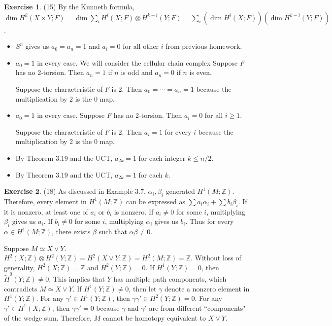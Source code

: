 \documentclass[12pt, psamsfonts]{amsart}
\theoremstyle{definition}
\newtheorem*{exer}{Exercise}
\theoremstyle{remark}
\numberwithin{equation}{section}
\begin{document}
\begin{exer}{(15)}
  By the Kunneth formula, $\dim H^k(X \times Y; F) = \dim \sum_i H^i(X; F) \otimes H^{k - i}(Y; F) = \sum_i (\dim H^i(X; F))(\dim H^{k - i}(Y; F))$.
  \begin{itemize}
    \item
      $S^n$ gives us $a_0 = a_n = 1$ and $a_i = 0$ for all other $i$ from previous homework.
    \item
      $a_0 = 1$ in every case.
      We will consider the cellular chain complex
      Suppose $F$ has no 2-torsion.
      Then $a_n = 1$ if $n$ is odd and $a_n = 0$ if $n$ is even.

      Suppose the characteristic of $F$ is 2.
      Then $a_0 = \cdots = a_n = 1$ because the multiplication by 2 is the 0 map.
    \item
      $a_0 = 1$ in every case.
      Suppose $F$ has no 2-torsion.
      Then $a_i = 0$ for all $i \geq 1$.

      Suppose the characteristic of $F$ is 2.
      Then $a_i = 1$ for every $i$ because the multiplication by 2 is the 0 map.
    \item
      By Theorem 3.19 and the UCT, $a_{2k} = 1$ for each integer $k \leq n / 2$.
    \item
      By Theorem 3.19 and the UCT, $a_{2k} = 1$ for each $k$.
  \end{itemize}
\end{exer}


\begin{exer}{(18)}
  As discussed in Example 3.7, $\alpha_i, \beta_i$ generated $H^1(M; \mathbb{Z})$.
  Therefore, every element in $H^1(M; \mathbb{Z})$ can be expressed as $\sum a_i\alpha_i + \sum b_i\beta_i$.
  If it is nonzero, at least one of $a_i$ or $b_i$ is nonzero.
  If $a_i \ne 0$ for some $i$, multiplying $\beta_i$ gives us $a_i$.
  If $b_i \ne 0$ for some $i$, multiplying $\alpha_i$ gives us $b_i$.
  Thus for every $\alpha \in H^1(M; \mathbb{Z})$, there exists $\beta$ such that $\alpha\beta \ne 0$.

  Suppose $M \simeq X \vee Y$.
  $H^2(X; \mathbb{Z}) \otimes H^2(Y;\mathbb{Z}) = H^2(X \vee Y; \mathbb{Z}) = H^2(M; \mathbb{Z}) = \mathbb{Z}$.
  Without loss of generality, $H^2(X; \mathbb{Z}) = \mathbb{Z}$ and $H^2(Y; \mathbb{Z}) = 0$.
  If $H^1(Y; \mathbb{Z}) = 0$, then $\tilde{H}^0(Y; \mathbb{Z}) \ne 0$.
  This implies that $Y$ has multiple path components, which contradicts $M \simeq X \vee Y$.
  If $H^1(Y; \mathbb{Z}) \ne 0$, then let $\gamma$ denote a nonzero element in $H^1(Y; \mathbb{Z})$.
  For any $\gamma' \in H^1(Y; \mathbb{Z})$, then $\gamma\gamma' \in H^2(Y; \mathbb{Z}) = 0$.
  For any $\gamma' \in H^1(X; \mathbb{Z})$, then $\gamma\gamma' = 0$ because $\gamma$ and $\gamma'$ are from different ``components" of the wedge sum.
  Therefore, $M$ cannot be homotopy equivalent to $X \vee Y$.
\end{exer}
\end{document}
